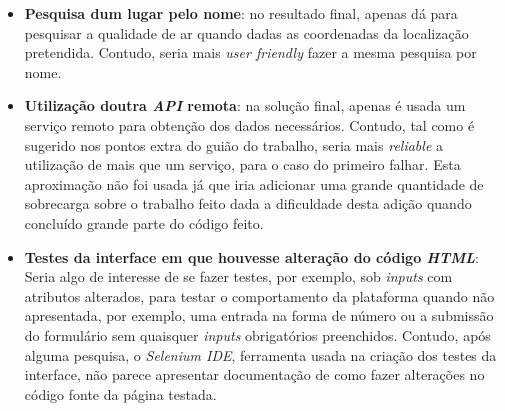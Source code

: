 \begin{itemize}
   \item \textbf{Pesquisa dum lugar pelo nome}: no resultado final, apenas dá para pesquisar a qualidade de 
ar quando dadas as coordenadas da localização pretendida. Contudo, seria mais \textit{user friendly} fazer a mesma
pesquisa por nome.
   \item \textbf{Utilização doutra \textit{API} remota}: na solução final, apenas é usada um serviço remoto para
obtenção dos dados necessários. Contudo, tal como é sugerido nos pontos extra do guião do trabalho, seria mais
\textit{reliable} a utilização de mais que um serviço, para o caso do primeiro falhar. Esta aproximação não foi usada
já que iria adicionar uma grande quantidade de sobrecarga sobre o trabalho feito dada a dificuldade desta adição 
quando concluído grande parte do código feito.
   \item \textbf{Testes da interface em que houvesse alteração do código \textit{HTML}}: Seria algo de interesse de se
fazer testes, por exemplo, sob \textit{inputs} com atributos alterados, para testar o comportamento da plataforma
quando não apresentada, por exemplo, uma entrada na forma de número ou a submissão do formulário sem quaisquer 
\textit{inputs} obrigatórios preenchidos. Contudo, após alguma pesquisa, o \textit{Selenium IDE}, ferramenta usada
na criação dos testes da interface, não parece apresentar documentação de como fazer alterações no código fonte da
página testada.
\end{itemize}